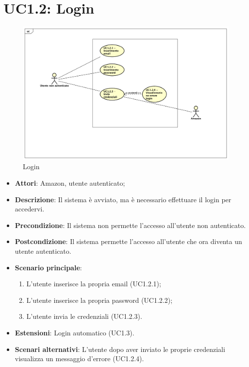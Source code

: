 \section{UC1.2: Login}
\label{UC1.2}
\begin{figure} [h]
	\centering
	\includegraphics[scale=0.4]{./Diagram/UC1-2.png}
	\caption{Login}\label{}
\end{figure}

\begin{itemize}
	\item \textbf{Attori}: Amazon, utente autenticato;
	\item \textbf{Descrizione}: Il sistema è avviato, ma è necessario effettuare il login per accedervi.
	\item \textbf{Precondizione}: Il sistema non permette l'accesso all'utente non autenticato.
	\item \textbf{Postcondizione}: Il sistema permette l'accesso all'utente che ora diventa un utente autenticato.
	\item \textbf{Scenario principale}:
	\begin{enumerate} \item L'utente inserisce la propria email (UC1.2.1);  \item  L'utente inserisce la propria password (UC1.2.2);  \item 
		L'utente invia le credenziali (UC1.2.3).\end{enumerate}
	\item \textbf{Estensioni}:
	Login automatico (UC1.3).
	\item \textbf{Scenari alternativi}:
	L'utente dopo aver inviato le proprie credenziali visualizza un messaggio d'errore (UC1.2.4).
\end{itemize}

